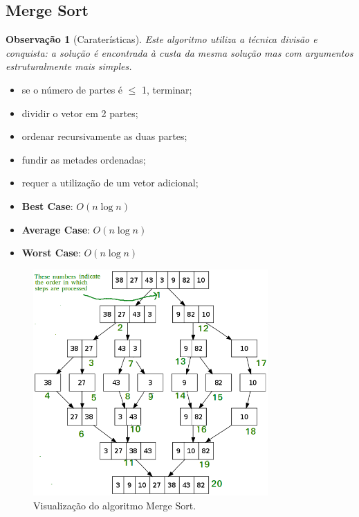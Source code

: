 \documentclass[a4paper, 12pt]{article}
\newtheorem{remark}{Observação}
\begin{document}
\subsection{Merge Sort}
\begin{remark}[Caraterísticas]
    Este algoritmo utiliza a técnica divisão e conquista: a solução é encontrada à custa da mesma solução mas com argumentos estruturalmente mais simples.\end{remark}
    \begin{itemize}[Funcionamento]
        \item se o número de partes é $\leq$ 1, terminar;
        \item dividir o vetor em 2 partes;
        \item ordenar recursivamente as duas partes;
        \item fundir as metades ordenadas;
    \end{itemize}
    \begin{itemize}
        \item requer a utilização de um vetor adicional;
        \item \textbf{Best Case}: $O(n\log n)$
        \item \textbf{Average Case}: $O(n\log n)$
        \item \textbf{Worst Case}: $O(n\log n)$
    \end{itemize}


\begin{center}
    \begin{figure}[h]
        \centering
        \includegraphics[width=0.8\textwidth]{fig/ao/ms.png}
        \caption{Visualização do algoritmo Merge Sort.}
    \end{figure}
\end{center}
\end{document}
